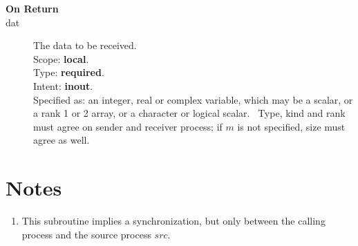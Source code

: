 \begin{description}
\item[\bf On Return]
\item[dat] The data to be received.\\
Scope: {\bf local}.\\
Type: {\bf required}.\\
Intent: {\bf inout}.\\
Specified as: an integer, real or complex variable, which may be a
scalar, or a rank 1 or 2 array, or a character or logical scalar. \
Type, kind and  rank must agree on sender and receiver process; if $m$ is
not specified, size must agree as well. 
\end{description}

\section*{Notes}
\begin{enumerate}
\item This subroutine implies a synchronization, but only between the
  calling process and the source  process $src$.
\end{enumerate}
